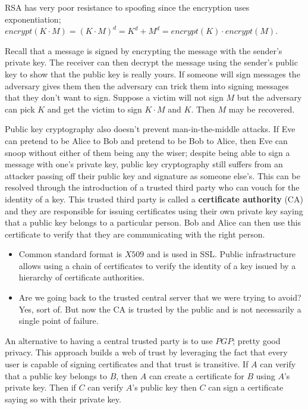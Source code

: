 \documentclass[../notes.tex]{subfiles}
\begin{document}
RSA has very poor resistance to spoofing since the encryption uses exponentiation; $ encrypt (K \cdot  M) = (K \cdot M)^d = K^d + M^d = encrypt(K) \cdot encrypt(M) $.

Recall that a message is signed by encrypting the message with the sender's private key. The receiver can then decrypt the message using the sender's public key to show that the public key is really yours.
If someone will sign messages the adversary gives them then the adversary can trick them into signing messages that they don't want to sign.
Suppose a victim will not sign $ M $ but the adversary can pick $  K $ and get the victim to sign $ K \cdot  M $ and $ K $. Then $ M $ may be recovered.



Public key cryptography also doesn't prevent man-in-the-middle attacks. If Eve can pretend to be Alice to Bob and pretend to be Bob to Alice, then Eve can snoop without either of them being any the wiser; despite being able to sign a message with one's private key, public key cryptography still suffers from an attacker passing off their public key and signature as someone else's.
This can be resolved through the introduction of a trusted third party who can vouch for the identity of a key.
This trusted third party is called a \textbf{certificate authority} (CA) and they are responsible for issuing certificates using their own private key saying that a public key belongs to a particular person.
Bob and Alice can then use this certificate to verify that they are communicating with the right person.


\begin{itemize}
    \item Common standard format is $ X509 $ and is used in SSL. Public infrastructure allows using a chain of certificates to verify the identity of a key issued by a hierarchy of certificate authorities.
    \item Are we going back to the trusted central server that we were trying to avoid? Yes, sort of. But now the CA is trusted by the public and is not necessarily a single point of failure.
\end{itemize}

An alternative to having a central trusted party is to use $ PGP $; pretty good privacy. This approach builds a web of trust by leveraging the fact that every user is capable of signing certificates and that trust is transitive. If $ A $ can verify that a public key belongs to $ B $, then $ A $ can create a certificate for $ B $ using $ A $'s private key. Then if $ C $ can verify $ A $'s public key then $ C $ can sign a certificate saying so with their private key.
\end{document}
